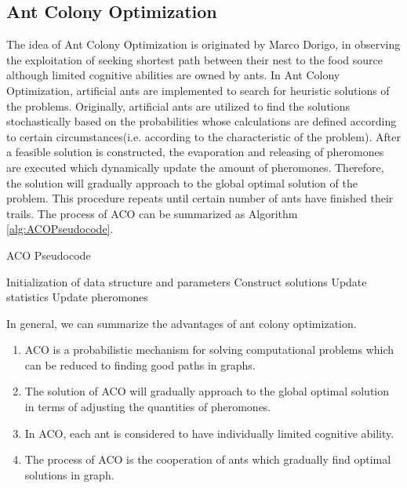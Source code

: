 \documentclass{elsarticle}
\begin{document}
\subsection{Ant Colony Optimization} \label{AntColonyOptimization}
The idea of Ant Colony Optimization is originated by Marco Dorigo\cite{label-41}, in observing the exploitation of seeking shortest path between their nest to the food source although limited cognitive abilities are owned by ants. In Ant Colony Optimization, artificial ants are implemented to search for heuristic solutions of the problems. Originally, artificial ants are utilized to find the solutions stochastically based on the probabilities whose calculations are defined according to certain circumstances(i.e. according to the characteristic of the problem). After a feasible solution is constructed, the evaporation and releasing of pheromones are executed which dynamically update the amount of pheromones. Therefore, the solution will gradually approach to the global optimal solution of the problem. This procedure repeats until certain number of ants have finished their trails. The process of ACO can be summarized as Algorithm \ref{alg:ACOPseudocode}.
\begin{algorithm}
\caption{ACO Pseudocode} \label{alg:ACOPseudocode}
\begin{algorithmic}[1]
\STATE Initialization of data structure and parameters
\STATE Construct solutions
\STATE Update statistics
\STATE Update pheromones
\ENDWHILE
\end{algorithmic}
\end{algorithm}

In general, we can summarize the advantages of ant colony optimization.
\begin{enumerate}
\item  ACO is a probabilistic mechanism for solving computational problems which can be reduced to finding good paths in graphs.\label{item1}
\item The solution of ACO will gradually approach to the global optimal solution in terms of adjusting the quantities of pheromones.\label{item2}
\item In ACO, each ant is considered to have individually limited cognitive ability.
\item The process of ACO is the cooperation of ants which gradually find optimal solutions in graph.
\end{enumerate}
\end{document}
